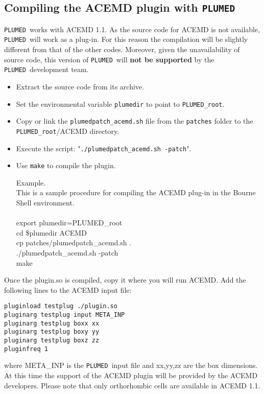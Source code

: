 \documentclass[12pt,fleqn]{report}
\newcommand{\plumed}{{\tt PLUMED}}
\newcommand{\esempio}[1]{
\vspace{10pt}
\begin{flushright}
\colorbox{light-gray}{
   \begin{minipage}{13cm}
       \scriptsize{
{\fontfamily{phv} \fontseries{b}
 \selectfont Example. \\
 \fontseries{m} \selectfont #1 } }
\end{minipage}}
\end{flushright}
\vspace{20pt}
}
\begin{document}
\subsection{Compiling the ACEMD plugin with \plumed}
\plumed \ works with ACEMD 1.1.
As the source code for ACEMD is not available, \plumed \ 
will work as a plug-in. For this reason the compilation
will be slightly different from that of the other codes.
Moreover, given the unavailability of source code,
this version of \plumed \ will {\bf not be supported} by the \plumed \ 
development team. 

\begin{itemize}
\item Extract the source code from its archive.
\item Set the environmental variable {\tt plumedir} to point to {\tt PLUMED\_root}. 
\item Copy or link the {\tt plumedpatch\_acemd.sh} file from the {\tt patches} folder to the {\tt PLUMED\_root}/ACEMD directory.
\item Execute the script: "{\tt ./plumedpatch\_acemd.sh  -patch}".
\item Use {\tt make} to compile the plugin. 

\esempio{
This is a sample procedure for compiling the ACEMD plug-in in the Bourne Shell environment.\\ \\

{
export plumedir=PLUMED\_root\\
cd \$plumedir ACEMD \\
cp patches/plumedpatch\_acemd.sh . \\
./plumedpatch\_acemd.sh -patch\\
make 
}}
\end{itemize}
Once the plugin.so is compiled, copy it where you will run ACEMD.
Add the following lines to the ACEMD input file:
\begin{verbatim}
pluginload testplug ./plugin.so
pluginarg testplug input META_INP
pluginarg testplug boxx xx 
pluginarg testplug boxy yy   
pluginarg testplug boxz zz 
pluginfreq 1
\end{verbatim}

where META\_INP is the \plumed \ input file and xx,yy,zz are the box dimensions.
At this time the support of the ACEMD plugin will be provided by the ACEMD
developers. Please note that only orthorhombic cells are available in ACEMD 1.1.

\end{document}
